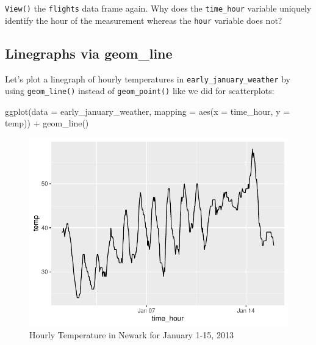 \documentclass[
  letterpaper,
  DIV=11,
  numbers=noendperiod]{scrreprt}
\newenvironment{Shaded}{\begin{snugshade}}{\end{snugshade}}
\newcommand{\AttributeTok}[1]{\textcolor[rgb]{0.40,0.45,0.13}{#1}}
\newcommand{\FunctionTok}[1]{\textcolor[rgb]{0.28,0.35,0.67}{#1}}
\newcommand{\NormalTok}[1]{\textcolor[rgb]{0.00,0.23,0.31}{#1}}
\newcommand{\SpecialCharTok}[1]{\textcolor[rgb]{0.37,0.37,0.37}{#1}}
\theoremstyle{definition}
\theoremstyle{remark}
\begin{document}
\begin{tcolorbox}[enhanced jigsaw, coltitle=black, toprule=.15mm, bottomtitle=1mm, breakable, leftrule=.75mm, title={{🎯} Learning Check 2.10}, opacitybacktitle=0.6, colback=white, rightrule=.15mm, opacityback=0, toptitle=1mm, colbacktitle=quarto-callout-tip-color!10!white, colframe=quarto-callout-tip-color-frame, titlerule=0mm, arc=.35mm, bottomrule=.15mm, left=2mm]
\texttt{View()} the \texttt{flights} data frame again. Why does the
\texttt{time\_hour} variable uniquely identify the hour of the
measurement whereas the \texttt{hour} variable does not?
\end{tcolorbox}

\hypertarget{sec-geomline}{%
\subsection{Linegraphs via geom\_line}\label{sec-geomline}}

Let's plot a linegraph of hourly temperatures in
\texttt{early\_january\_weather} by using \texttt{geom\_line()} instead
of \texttt{geom\_point()} like we did for scatterplots:

\begin{Shaded}
\begin{Highlighting}[]
\FunctionTok{ggplot}\NormalTok{(}\AttributeTok{data =}\NormalTok{ early\_january\_weather, }\AttributeTok{mapping =} \FunctionTok{aes}\NormalTok{(}\AttributeTok{x =}\NormalTok{ time\_hour, }\AttributeTok{y =}\NormalTok{ temp)) }\SpecialCharTok{+}
  \FunctionTok{geom\_line}\NormalTok{()}
\end{Highlighting}
\end{Shaded}

\begin{figure}[H]

{\centering \includegraphics{02-visualization_files/figure-pdf/fig-hourlytemp-1.pdf}

}

\caption{\label{fig-hourlytemp}Hourly Temperature in Newark for January
1-15, 2013}

\end{figure}
\end{document}
